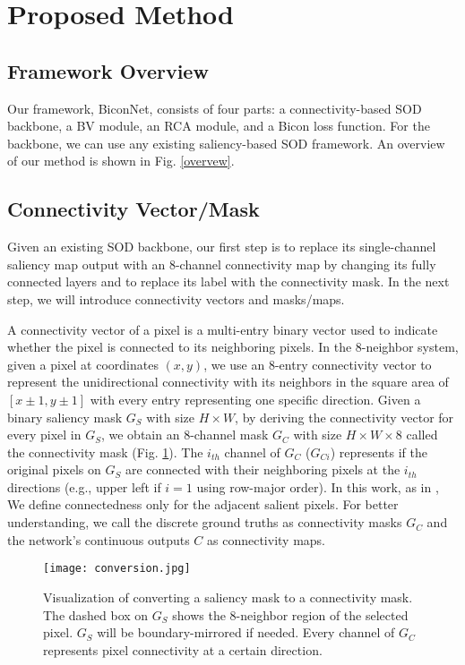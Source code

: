 \documentclass[final]{cvpr}
\begin{document}
\section{Proposed Method}
\subsection{Framework Overview}
Our framework, BiconNet, consists of four parts: a connectivity-based SOD backbone, a BV module, an RCA module, and a Bicon loss function. For the backbone, we can use any existing saliency-based SOD framework. An overview of our method is shown in Fig. \ref{overvew}.

\subsection{Connectivity Vector/Mask}
Given an existing SOD backbone, our first step is to replace its single-channel saliency map output with an 8-channel connectivity map by changing its fully connected layers and to replace its label with the connectivity mask. In the next step, we will introduce connectivity vectors and masks/maps. 

A connectivity \cite{connectivity} vector of a pixel is a multi-entry binary vector used to indicate whether the pixel is connected to its neighboring pixels. In the 8-neighbor system, given a pixel at coordinates  $(x,y)$, we use an 8-entry connectivity vector to represent the unidirectional connectivity with its neighbors in the square area of $[x\pm 1,y\pm 1]$ with every entry representing one specific direction. Given a binary saliency mask $G_S$ with size $H\times W$, by deriving the connectivity vector for every pixel in $G_S$, we obtain an 8-channel mask $G_C$ with size $H\times W \times 8$ called the connectivity mask (Fig. \ref{conversion}). The $i_{th}$ channel of $G_{C}$ ($G_{Ci}$) represents if the original pixels on $G_S$ are connected with their neighboring pixels at the $i_{th}$ directions (e.g., upper left if $i=1$ using row-major order). In this work, as in \cite{ConnNet}, We define connectedness only for the adjacent salient pixels. For better understanding, we call the discrete ground truths as connectivity masks $G_C$  and the network’s continuous outputs $C$ as connectivity maps.

\begin{figure}[h!]
\begin{center}
   \texttt{[image: conversion.jpg]}
\end{center}
\vspace{-8pt}
   \caption{Visualization of converting a saliency mask to a connectivity mask. The dashed box on $G_S$ shows the 8-neighbor region of the selected pixel. $G_S$ will be boundary-mirrored if needed. Every channel of $G_C$ represents pixel connectivity at a certain direction.}
   \vspace{-10pt}
\label{conversion}
\end{figure}
\end{document}

